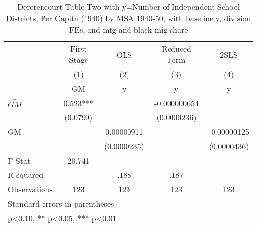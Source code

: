 \begin{table}[htbp]\centering
\def\sym#1{\ifmmode^{#1}\else\(^{#1}\)\fi}
\caption{Dererencourt Table Two with y=Number of Independent School Districts, Per Capita (1940) by MSA 1940-50, with baseline y, division FEs, and mfg and black mig share}
\begin{tabular}{l*{4}{c}}
\toprule
                    & First Stage   &         OLS   &Reduced Form   &        2SLS   \\
                    &\multicolumn{1}{c}{(1)}&\multicolumn{1}{c}{(2)}&\multicolumn{1}{c}{(3)}&\multicolumn{1}{c}{(4)}\\
                    &\multicolumn{1}{c}{GM}&\multicolumn{1}{c}{y}&\multicolumn{1}{c}{y}&\multicolumn{1}{c}{y}\\
\midrule
$\hat{GM}$          &       0.523***&               &-0.000000654   &               \\
                    &    (0.0799)   &               & (0.0000236)   &               \\
\addlinespace
GM                  &               &  0.00000911   &               & -0.00000125   \\
                    &               & (0.0000235)   &               & (0.0000436)   \\
\midrule
F-Stat              &      20.741   &               &               &               \\
R-squared           &               &        .188   &        .187   &               \\
Observations        &         123   &         123   &         123   &         123   \\
\bottomrule
\multicolumn{5}{l}{\footnotesize Standard errors in parentheses}\\
\multicolumn{5}{l}{\footnotesize * p<0.10, ** p<0.05, *** p<0.01}\\
\end{tabular}
\end{table}
